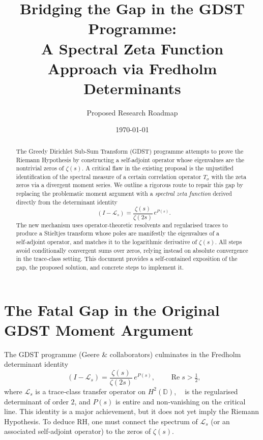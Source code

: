 \documentclass[11pt,a4paper]{article}
\title{\bf Bridging the Gap in the GDST Programme:\\
A Spectral Zeta Function Approach via Fredholm Determinants}
\author{Proposed Research Roadmap}
\date{\today}
\newcommand{\LOp}{\mathcal{L}}
\newcommand{\RE}{\operatorname{Re}}
\DeclareMathOperator{\detreg}{det_{(2)}}
\begin{document}
\maketitle

\begin{abstract}
The Greedy Dirichlet Sub‑Sum Transform (GDST) programme attempts to prove the Riemann Hypothesis by constructing a self‑adjoint operator whose eigenvalues are the nontrivial zeros of \(\zeta(s)\). A critical flaw in the existing proposal is the unjustified identification of the spectral measure of a certain correlation operator \(T_\sigma\) with the zeta zeros via a divergent moment series. We outline a rigorous route to repair this gap by replacing the problematic moment argument with a \emph{spectral zeta function} derived directly from the determinant identity
\[
\detreg(I-\LOp_s) = \frac{\zeta(s)}{\zeta(2s)}\,e^{P(s)}.
\]
The new mechanism uses operator‑theoretic resolvents and regularised traces to produce a Stieltjes transform whose poles are manifestly the eigenvalues of a self‑adjoint operator, and matches it to the logarithmic derivative of \(\zeta(s)\). All steps avoid conditionally convergent sums over zeros, relying instead on absolute convergence in the trace‑class setting. This document provides a self‑contained exposition of the gap, the proposed solution, and concrete steps to implement it.
\end{abstract}

\section{The Fatal Gap in the Original GDST Moment Argument}

The GDST programme (Geere \& collaborators) culminates in the Fredholm determinant identity
\begin{equation}\label{eq:detid}
\detreg(I - \LOp_s) = \frac{\zeta(s)}{\zeta(2s)} \, e^{P(s)},\qquad \RE s > \tfrac12,
\end{equation}
where \(\LOp_s\) is a trace‑class transfer operator on \(H^2(\mathbb{D})\), \(\detreg\) is the regularised determinant of order \(2\), and \(P(s)\) is entire and non‑vanishing on the critical line. This identity is a major achievement, but it does not yet imply the Riemann Hypothesis. To deduce RH, one must connect the spectrum of \(\LOp_s\) (or an associated self‑adjoint operator) to the zeros of \(\zeta(s)\).
\end{document}
